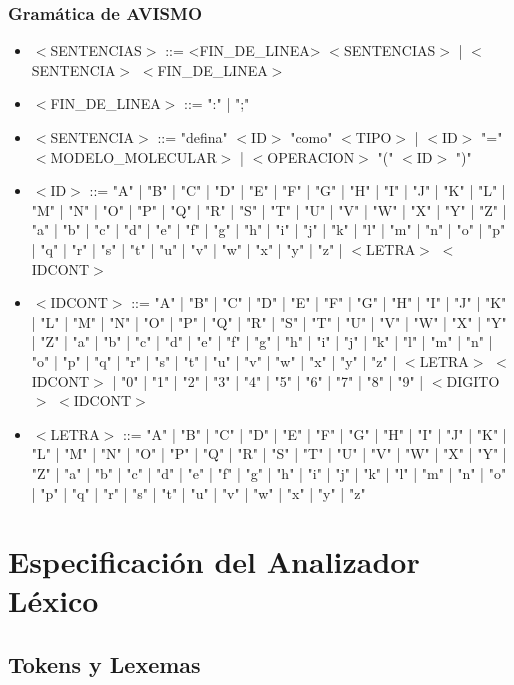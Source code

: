 \documentclass[14pt, aspectratio=169]{beamer}
\begin{document}
\begin{frame}[allowframebreaks]
    \frametitle{Gramática de AVISMO}
    \begin{itemize}
        \item $<$SENTENCIAS$>$ ::= <FIN\_DE\_LINEA> $<$SENTENCIAS$>$ | $<$SENTENCIA$>$ $<$FIN\_DE\_LINEA$>$
        \item $<$FIN\_DE\_LINEA$>$ ::= ":" | ";"
        \item $<$SENTENCIA$>$ ::= "defina" $<$ID$>$ "como" $<$TIPO$>$ | $<$ID$>$ "="  $<$MODELO\_MOLECULAR$>$ | $<$OPERACION$>$ "(" $<$ID$>$ ")"
        \item $<$ID$>$ ::= "A" | "B" | "C" | "D" | "E" | "F" | "G" | "H" | "I" | "J" | "K" | "L" | "M" | "N" | "O" | "P" | "Q" | "R" | "S" | "T" | "U" | "V" | "W" | "X" | "Y" | "Z" | "a" | "b" | "c" | "d" | "e" | "f" | "g" | "h" | "i" | "j" | "k" | "l" | "m" | "n" | "o" | "p" | "q" | "r" | "s" | "t" | "u" | "v" | "w" | "x" | "y" | "z" | $<$LETRA$>$ $<$IDCONT$>$
        \item $<$IDCONT$>$ ::= "A" | "B" | "C" | "D" | "E" | "F" | "G" | "H" | "I" | "J" | "K" | "L" | "M" | "N" | "O" | "P" | "Q" | "R" | "S" | "T" | "U" | "V" | "W" | "X" | "Y" | "Z" | "a" | "b" | "c" | "d" | "e" | "f" | "g" | "h" | "i" | "j" | "k" | "l" | "m" | "n" | "o" | "p" | "q" | "r" | "s" | "t" | "u" | "v" | "w" | "x" | "y" | "z" | $<$LETRA$>$ $<$IDCONT$>$ | "0" | "1" | "2" | "3" | "4" | "5" | "6" | "7" | "8" | "9" | $<$DIGITO$>$ $<$IDCONT$>$
        \item $<$LETRA$>$ ::= "A" | "B" | "C" | "D" | "E" | "F" | "G" | "H" | "I" | "J" | "K" | "L" | "M" | "N" | "O" | "P" | "Q" | "R" | "S" | "T" | "U" | "V" | "W" | "X" | "Y" | "Z" | "a" | "b" | "c" | "d" | "e" | "f" | "g" | "h" | "i" | "j" | "k" | "l" | "m" | "n" | "o" | "p" | "q" | "r" | "s" | "t" | "u" | "v" | "w" | "x" | "y" | "z"
    \end{itemize}
\end{frame}

\section{Especificación del Analizador Léxico}

\subsection{Tokens y Lexemas}
\end{document}
